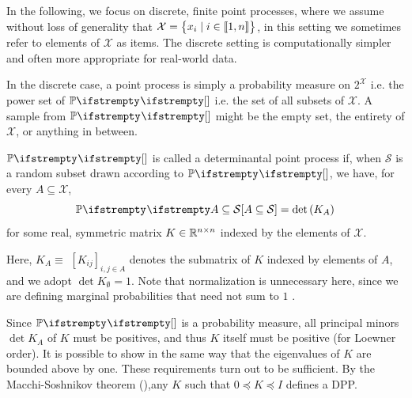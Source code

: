 In the following, we focus on discrete, finite point processes, where we assume without loss of generality that $\mathcal{X}=\begin{Bmatrix}
    x_{i} \mid i\in \llbracket 1,n \rrbracket
    \end{Bmatrix}$, in this setting we sometimes refer to elements of $\mathcal{X}$ as items. The discrete setting is computationally simpler and often more appropriate for real-world data.

In the discrete case, a point process is simply a probability measure on $2^{\mathcal X}$ i.e. the power set of $\PP{}{}$ i.e. the set of all subsets of $\mathcal{X}$. A sample from $\PP{}{}$ might be the empty set, the entirety of $\mathcal{X}$, or anything in between. 
\begin{definition}
    \label{def_dpp}
    $\PP{}{}$ is called a determinantal point process if, when $\mathcal{S}$ is a random subset drawn according to $\PP{}{}$, we have, for every $A \subseteq \mathcal{X}$,
    \begin{equation}
        \PP{}{A \subseteq \mathcal{S}}=\operatorname{det}\left(K_A\right)
    \end{equation}
    for some real, symmetric matrix $K \in \mathbb{R}^{n \times n}$ indexed by the elements of $\mathcal{X}$.
\end{definition}
Here, $K_A \equiv$ $\left[K_{i j}\right]_{i, j \in A}$ denotes the submatrix of $K$ indexed by elements of $A$, and we adopt $\operatorname{det}K_\emptyset=1$. Note that normalization is unnecessary here, since we are defining marginal probabilities that need not sum to $1$ .

Since $\PP{}{}$ is a probability measure, all principal minors $\operatorname{det}K_A$ of $K$ must be positives, and thus $K$ itself must be positive (for Loewner order). It is possible to show in the same way that the eigenvalues of $K$ are bounded above by one. These requirements turn out to be sufficient. By the Macchi-Soshnikov theorem (\cite{macchi1975dpp}),any $K$ such that $0 \preceq K \preceq I$ defines a DPP.

